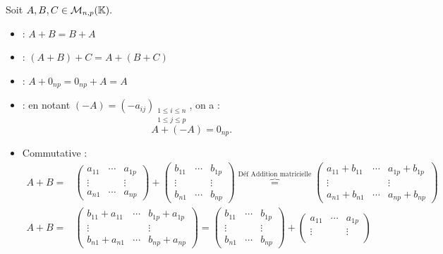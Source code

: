 \documentclass{book}
\begin{document}
\begin{Proposition}
Soit $A,B,C\in \MnpK.$
\begin{itemize}
\item {} : $A+B=B+A$
\item {} : $(A+B)+C=A+(B+C)$
\item {} : $A+0_{np}=0_{np}+A=A$
\item {} : en notant $(-A)=(-a_{ij})_{\substack{1\leq i\leq n\\1\leq j\leq p}}$, on a :
$$A+(-A)=0_{np}.$$
\end{itemize}
\end{Proposition}
\begin{Demonstration}
\begin{itemize}
\item Commutative : $$\begin{aligned}
A+B=&\begin{pmatrix}
a_{11} & \cdots & a_{1p}\\
 \vdots &  & \vdots\\
a_{n1} & \cdots & a_{np}
\end{pmatrix}+\begin{pmatrix}
b_{11} & \cdots & b_{1p}\\
 \vdots &  & \vdots\\
b_{n1} & \cdots & b_{np}
\end{pmatrix}\overbrace{=}^{\text{Déf Addition matricielle}}\begin{pmatrix}
a_{11}+b_{11} & \cdots & a_{1p}+b_{1p}\\
 \vdots &  & \vdots\\
a_{n1}+b_{n1} & \cdots & a_{np}+b_{np}
\end{pmatrix}\\
A+B=&\begin{pmatrix}
b_{11}+ a_{11} & \cdots & b_{1p}+a_{1p}\\
 \vdots &  & \vdots\\
b_{n1}+a_{n1} & \cdots & b_{np}+a_{np}
\end{pmatrix}=\begin{pmatrix}
b_{11} & \cdots & b_{1p}\\
 \vdots &  & \vdots\\
b_{n1} & \cdots & b_{np}
\end{pmatrix}+\begin{pmatrix}
a_{11} & \cdots & a_{1p}\\
 \vdots &  & \vdots\\

\end{pmatrix}
\end{aligned}$$
\end{itemize}
\end{Demonstration}
\end{document}
